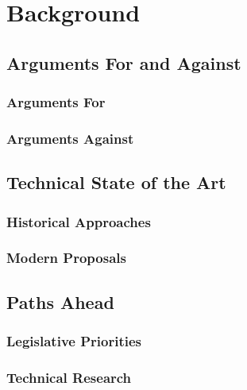 \chapter{Background}

\section{Arguments For and Against}

\subsection{Arguments For}

\subsection{Arguments Against}

\section{Technical State of the Art}

\subsection{Historical Approaches}

\subsection{Modern Proposals}

\section{Paths Ahead}

\subsection{Legislative Priorities}

\subsection{Technical Research}
